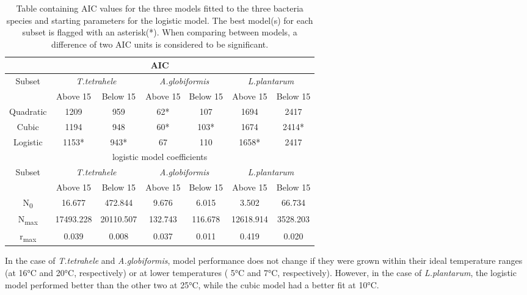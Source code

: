 \documentclass[a4paper]{article}
\begin{document}
\begin{table}[H]
\caption{Table containing AIC values for the three models fitted to the three bacteria species and starting parameters for the logistic model. The best model(s) for each subset is flagged with an asterisk(*). When comparing between models, a difference of two AIC units is considered to be significant.}
\centering
    \begin{tabular}{c|c|c||c|c||c|c}
    \hline
    \hline
    \multicolumn{7}{c}{AIC}\\
    \hline
    \multirow{2}{*}{Subset}&
    \multicolumn{2}{c||}{\textit{T.tetrahele}} &
    \multicolumn{2}{c||}{\textit{A.globiformis}} &
    \multicolumn{2}{c}{\textit{L.plantarum}}\\ 
    & Above 15 & Below 15 & Above 15 & Below 15 & Above 15 & Below 15 \\
    \hline
    Quadratic & 1209 & 959 & 62* &107 & 1694 & 2417 \\
    Cubic & 1194 & 948 & 60* & 103* & 1674 & 2414* \\
    Logistic & 1153* & 943* & 67 & 110 & 1658* & 2417\\
    \hline
    \hline
    \multicolumn{7}{c}{logistic model coefficients}\\
    \hline
    \multirow{2}{*}{Subset}&
    \multicolumn{2}{c||}{\textit{T.tetrahele}} &
    \multicolumn{2}{c||}{\textit{A.globiformis}} &
    \multicolumn{2}{c}{\textit{L.plantarum}}\\ 
    & Above 15 & Below 15 & Above 15 & Below 15 & Above 15 & Below 15 \\
    \hline
    N\textsubscript{0} & 16.677 & 472.844 & 9.676 & 6.015 & 3.502 & 66.734 \\
    N\textsubscript{max} & 17493.228 & 20110.507 & 132.743 & 116.678 & 12618.914 & 3528.203 \\
    r\textsubscript{max} & 0.039 & 0.008 & 0.037 & 0.011 & 0.419 & 0.020\\
    \hline\hline
    \end{tabular}
\label{tab:hresult}
\end{table}
In the case of \textit{T.tetrahele} and \textit{A.globiformis}, model performance does not change if they were grown within their ideal temperature ranges (at 16°C and 20°C, respectively) or at lower temperatures ( 5°C and 7°C, respectively). However, in the case of \textit{L.plantarum}, the logistic model performed better than the other two at 25°C, while the cubic model had a better fit at 10°C. 
\end{document}

